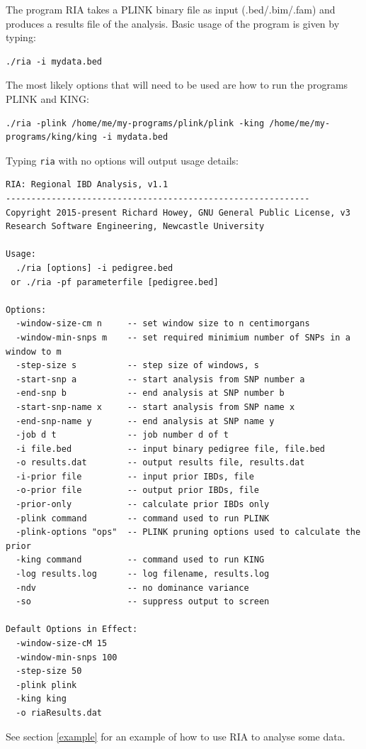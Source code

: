 \documentclass[a4paper,12pt]{article}
\newcommand{\code}[1]{{\footnotesize{{\tt #1}}}}
\begin{document}
The program RIA takes a PLINK binary file as input (.bed/.bim/.fam) and produces a results file of the analysis. Basic usage of the program is given by typing: 
\vspace{0.35cm} \begin{lstlisting}
./ria -i mydata.bed

\end{lstlisting} \vspace{0.35cm}
The most likely options that will need to be used are how to run the programs PLINK and KING: 
\vspace{0.35cm} \begin{lstlisting}
./ria -plink /home/me/my-programs/plink/plink -king /home/me/my-programs/king/king -i mydata.bed

\end{lstlisting} \vspace{0.35cm}
Typing \code{ria} with no options will output usage details: 
\vspace{0.35cm} \begin{lstlisting}
RIA: Regional IBD Analysis, v1.1
------------------------------------------------------------
Copyright 2015-present Richard Howey, GNU General Public License, v3
Research Software Engineering, Newcastle University

Usage:
  ./ria [options] -i pedigree.bed
 or ./ria -pf parameterfile [pedigree.bed]

Options:
  -window-size-cm n     -- set window size to n centimorgans
  -window-min-snps m    -- set required minimium number of SNPs in a window to m
  -step-size s          -- step size of windows, s
  -start-snp a          -- start analysis from SNP number a
  -end-snp b            -- end analysis at SNP number b
  -start-snp-name x     -- start analysis from SNP name x
  -end-snp-name y       -- end analysis at SNP name y
  -job d t              -- job number d of t
  -i file.bed           -- input binary pedigree file, file.bed
  -o results.dat        -- output results file, results.dat
  -i-prior file         -- input prior IBDs, file
  -o-prior file         -- output prior IBDs, file
  -prior-only           -- calculate prior IBDs only
  -plink command        -- command used to run PLINK
  -plink-options "ops"  -- PLINK pruning options used to calculate the prior
  -king command         -- command used to run KING
  -log results.log      -- log filename, results.log
  -ndv                  -- no dominance variance
  -so                   -- suppress output to screen

Default Options in Effect:
  -window-size-cM 15
  -window-min-snps 100
  -step-size 50
  -plink plink
  -king king
  -o riaResults.dat

\end{lstlisting} \vspace{0.35cm}
See  section \ref{example} for an example of how to use RIA to analyse some data. 
\end{document}
